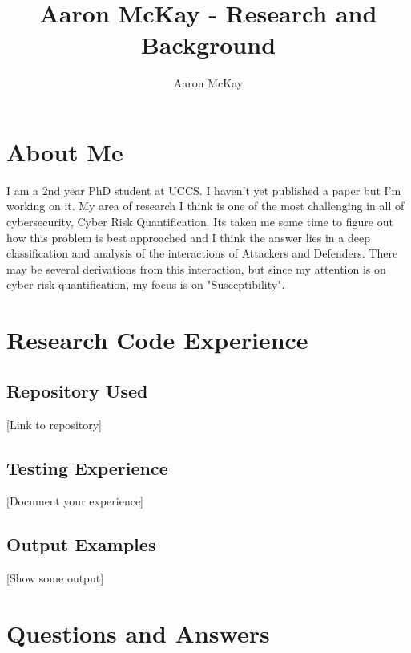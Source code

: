 \documentclass{article}
\begin{document}
\title{Aaron McKay - Research and Background}
\author{Aaron McKay}
\maketitle

\section{About Me}
I am a 2nd year PhD student at UCCS.  I haven't yet published a paper but I'm working on it.  My area of research I think is one of the most challenging in all of cybersecurity, Cyber Risk Quantification.  Its taken me some time to figure out how this problem is best approached and I think the answer lies in a deep classification and analysis of the interactions of Attackers and Defenders. There may be several derivations from this interaction, but since my attention is on cyber risk quantification, my focus is on "Susceptibility". 

\section{Research Code Experience}
\subsection{Repository Used}
[Link to repository]

\subsection{Testing Experience}
[Document your experience]

\subsection{Output Examples}
[Show some output]

\section{Questions and Answers}
\end{document}
